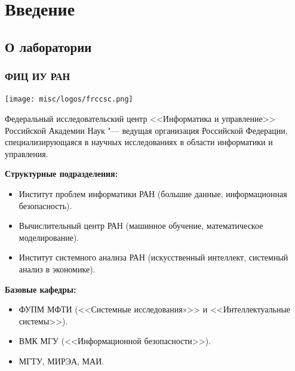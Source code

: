 \section{Введение}
	\subsection{О лаборатории}
	
		
	\begin{frame}
		\frametitle{ФИЦ ИУ РАН}
		\begin{center}
			\texttt{[image: misc/logos/frccsc.png]}
		\end{center}
		
		\par\bigskip
		\scriptsize
		Федеральный исследовательский центр <<Информатика и управление>> Российской Академии Наук "--- ведущая организация Российской Федерации, специализирующаяся в научных исследованиях в области информатики и управления.
		
		\textbf{Структурные подразделения:}
		\begin{itemize}
			\item Институт проблем информатики РАН (большие данные, информационная безопасность).
			\item Вычислительный центр РАН (машинное обучение, математическое моделирование).
			\item Институт системного анализа РАН (искусственный интеллект, системный анализ в экономике).
		\end{itemize}
		
		\textbf{Базовые кафедры:}
		\begin{itemize}
			\item ФУПМ МФТИ (<<Системные исследования»>> и <<Интеллектуальные системы>>).
			\item ВМК МГУ (<<Информационной безопасности>>).
			\item МГТУ, МИРЭА, МАИ.
		\end{itemize}
	\end{frame}

